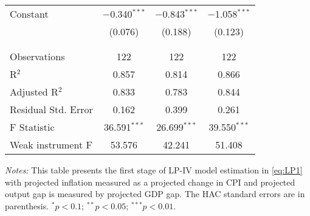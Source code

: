 \documentclass[11pt]{article}
\begin{document}
\begin{table}[!htbp]
\begin{threeparttable}
\begin{tabular}{@{\extracolsep{5pt}}lccc}
   Constant & $-$0.340$^{***}$ & $-$0.843$^{***}$ & $-$1.058$^{***}$ \\ 
    & (0.076) & (0.188) & (0.123) \\ 
    & & & \\ 
  \hline \\[-1.8ex] 
  Observations & 122 & 122 & 122 \\ 
  R$^{2}$ & 0.857 & 0.814 & 0.866 \\ 
  Adjusted R$^{2}$ & 0.833 & 0.783 & 0.844 \\ 
  Residual Std. Error & 0.162 & 0.399 & 0.261 \\ 
  F Statistic & 36.591$^{***}$ & 26.699$^{***}$ & 39.550$^{***}$ \\
  Weak instrument F & 53.576 & 42.241 & 51.408 \\
  \hline 
  \hline
\end{tabular} 
  \begin{tablenotes}[flushleft]
    \item[]\textit{Notes:} This table presents the first stage of LP-IV model estimation in \vref{eq:LP1} with projected inflation measured as a projected change in CPI and projected output gap is measured by projected GDP gap. The \citet{Andrews1991} HAC standard errors are in parenthesis. $^{*}p<0.1$; $^{**}p<0.05$; $^{***}p<0.01$.
  \end{tablenotes}
\end{threeparttable}
  \end{table} 
\end{document}

